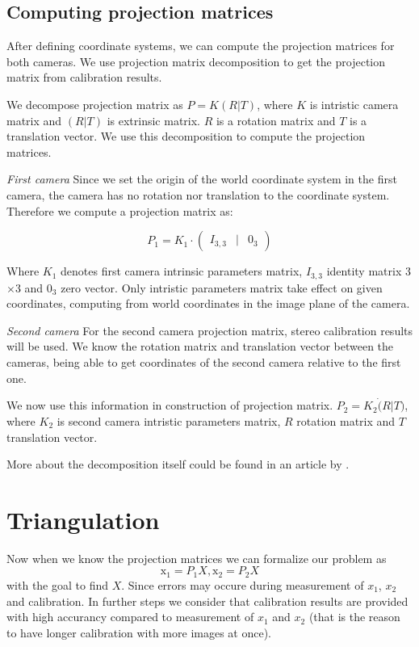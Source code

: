 \subsection{Computing projection matrices}
After defining coordinate systems, we can compute the projection matrices for
both cameras. We use projection matrix decomposition to get the projection matrix
from calibration results.

We decompose projection matrix as $P = K(R|T)$, where $K$ is intristic
camera matrix and $(R|T)$ is extrinsic matrix. $R$ is a rotation matrix and
$T$ is a translation vector. We use this decomposition to compute the projection
matrices.

\emph{First camera}
Since we set the origin of the world coordinate system in the first camera,
the camera has no rotation nor translation to the coordinate system. Therefore
we compute a projection matrix as:

\[
 P_1 = K_1 \cdot \begin{pmatrix}
	I_{3, 3} & | & 0_3  
\end{pmatrix}
\]

Where $K_1$ denotes first camera intrinsic parameters matrix, $I_{3,3}$ identity
matrix 3$\times$3 and $0_3$ zero vector. Only intristic parameters matrix take
effect on given coordinates, computing from world coordinates in the image plane of the camera.

\emph{Second camera}
For the second camera projection matrix, stereo calibration results will be
used. We know the rotation matrix and translation vector between the cameras,
being able to get coordinates of the second camera relative to the first one.

We now use this information in construction of projection matrix. $P_2 = K_2
\dot (R | T)$, where $K_2$ is second camera intristic parameters matrix, $R$
rotation matrix and $T$ translation vector.

More about the decomposition itself could be found in an article by
\citet{computervisionblog}.


\section{Triangulation}
Now when we know the projection matrices we can formalize our problem as
\begin{equation}
\mathrm{x_1} = P_1X, \mathrm{x_2} = P_2X \label{projection-statements}
\end{equation}
with the goal to find $X$. Since errors may occure during
measurement of $x_1$, $x_2$ and calibration. In further steps we consider that
calibration results are provided with high accurancy compared to measurement of
$x_1$ and $x_2$ (that is the reason to have longer calibration with more images
at once).

